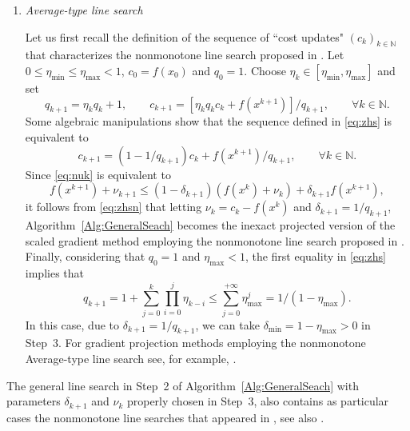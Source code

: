 \begin{enumerate}
	\item {\it Average-type line search}

	      Let us first recall the definition of the sequence of ``cost updates" $(c_k)_{k\in\mathbb{N}}$  that  characterizes the nonmonotone line search proposed in  \cite{ZhangHager2004}. Let   $0\leq \eta_{\min}\leq \eta_{\max}<1$,   $c_0 = f(x_0)$ and  $q_0 = 1$. Choose $\eta_k\in [\eta_{\min},  \eta_{\max}]$ and set
	      \begin{equation} \label{eq:zhs}
		      q_{k+1}=\eta_kq_{k}+1, \qquad c_{k+1} = [\eta_kq_kc_k + f(x^{k+1})]/q_{k+1}, \qquad \forall k \in \mathbb{N}.
	      \end{equation}
	      Some algebraic manipulations show that the sequence defined in   \eqref{eq:zhs} is equivalent to
	      \begin{equation} \label{eq:zhsn}
		      c_{k+1} = (1-1/q_{k+1})c_{k}+f(x^{k+1})/q_{k+1}, \qquad \forall k \in \mathbb{N}.
	      \end{equation}
	      Since \eqref{eq:nuk} is equivalent  to  
	      $$ 
	        f(x^{k+1})+ \nu_{k+1}\leq (1-\delta_{k+1})(f(x^{k})+\nu_{k})+\delta_{k+1}f(x^{k+1}),
	      $$
	      it follows from \eqref{eq:zhsn} that  letting  $\nu_{k}=c_k-f(x^k)$ and $\delta_{k+1}=1/q_{k+1}$, Algorithm~\ref{Alg:GeneralSeach} becomes the  inexact   projected  version of the scaled gradient method employing   the nonmonotone line search proposed in   \cite{ZhangHager2004}.  Finally,  considering that $q_0 = 1$ and  $\eta_{\max}<1$, the  first equality in   \eqref{eq:zhs} implies  that 
	      $$
	      q_{k+1}=1+\sum_{j=0}^{k}\prod_{i=0}^{j}\eta_{k-i}\leq \sum_{j=0}^{+\infty} \eta_{\max}^{j}=1/(1-\eta_{\max}).
	      $$
	      In this case, due to $\delta_{k+1}=1/q_{k+1}$, we can take   $\delta_{\min}=1-\eta_{\max}>0$ in  Step~3.  For gradient projection methods employing   the nonmonotone Average-type line search see, for example, \cite{Paulo2007,Schuverdt2019,  Xihong2018}.
\end{enumerate}
\begin{remark} \label{rem:outras}
	The general line search in Step~2 of Algorithm~\ref{Alg:GeneralSeach} with  parameters  $\delta_{k+1}$  and  $\nu_{k}$ properly chosen in Step~3, also contains as particular cases the nonmonotone line searches  that appeared in  \cite{Ahookhosh2012,MoLiuYan2007}, see also \cite{GrapigliaSachs2017}.
\end{remark}

